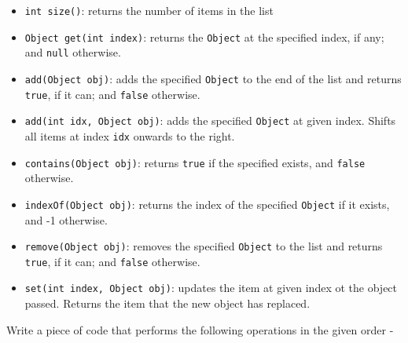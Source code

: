 \begin{questions}
\begin{itemize}
\item \texttt{int size()}: returns the number of items in the list
\item \texttt{Object get(int index)}: returns the \texttt{Object} at the specified index, if any; and \texttt{null} otherwise.
\item \texttt{add(Object obj)}: adds the specified \texttt{Object} to the end of the list and returns \texttt{true}, if it can; and \texttt{false} otherwise.
\item \texttt{add(int idx, Object obj)}: adds the specified \texttt{Object} at given index. Shifts all items at index \texttt{idx} onwards to the right.
\item \texttt{contains(Object obj)}: returns \texttt{true} if the specified exists, and \texttt{false} otherwise.
\item \texttt{indexOf(Object obj)}: returns the index of the specified \texttt{Object} if it exists, and -1 otherwise.
\item \texttt{remove(Object obj)}: removes the specified \texttt{Object} to the list and returns \texttt{true}, if it can; and \texttt{false} otherwise.
\item \texttt{set(int index, Object obj)}: updates the item at given index ot the object passed. Returns the item that the new object has replaced.
\end{itemize}

Write a piece of code that performs the following operations in the given order -


\end{questions}
